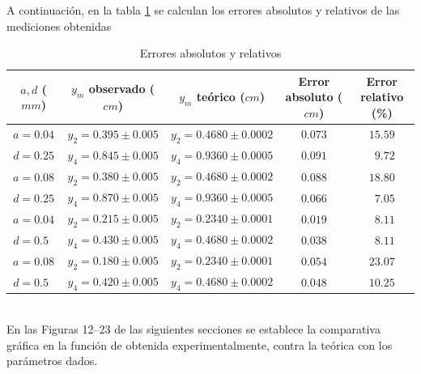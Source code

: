 \documentclass[12pt,a4paper]{article}
\begin{document}
 	A continuación, en la tabla \ref{tab:errores} se calculan los errores absolutos y relativos de las mediciones obtenidas
 	\begin{table}[!htb]
 		\centering
 		\caption{Errores absolutos y relativos}
 		\begin{tabular}{|c|c|c|c|c|}
 			\hline
			$ a, d $ (\(mm\)) & $ y_m $ observado (\(cm\)) & $ y_m $ teórico (\(cm\)) & Error absoluto (\(cm\)) & Error relativo (\textsc{\%})  \\
 			\hline
 			$ a=0.04 $          & $y_2=0.395\pm 0.005 $ & $y_2=0.4680\pm0.0002 $ & $ 0.073 $ & $ 15.59 $ \\ \cline{2-5}
 			$ d=0.25 $          & $y_4=0.845\pm 0.005 $ & $y_4=0.9360\pm0.0005 $ & $ 0.091 $ & $ \phantom{0}9.72 $ \\ \hline
 			$ a=0.08 $          & $y_2=0.380\pm 0.005 $ & $y_2=0.4680\pm0.0002 $ & $ 0.088 $ & $ 18.80 $ \\ \cline{2-5}
 			$ d=0.25 $          & $y_4=0.870\pm 0.005 $ & $y_4=0.9360\pm0.0005 $ & $ 0.066 $ & $ \phantom{0}7.05 $ \\ \hline
 			$ a=0.04 $          & $y_2=0.215\pm 0.005 $ & $y_2=0.2340\pm0.0001 $ & $ 0.019 $ & $ \phantom{0}8.11 $ \\ \cline{2-5}
 			$ d=0.5\phantom{0} $& $y_4=0.430\pm 0.005 $ & $y_4=0.4680\pm0.0002 $ & $ 0.038 $ & $ \phantom{0}8.11 $ \\ \hline
 			$ a=0.08 $          & $y_2=0.180\pm 0.005 $ & $y_2=0.2340\pm0.0001 $ & $ 0.054 $ & $ 23.07 $ \\ \cline{2-5}
 			$ d=0.5\phantom{0} $& $y_4=0.420\pm 0.005 $ & $y_4=0.4680\pm0.0002 $ & $ 0.048 $ & $ 10.25 $ \\ \hline
 		\end{tabular} 
 		\label{tab:errores}
 	\end{table}\\
	En las Figuras 12--23 de las siguientes secciones se establece la comparativa gráfica en la función de obtenida experimentalmente, contra la teórica con los parámetros dados.

	\newpage
\end{document}
